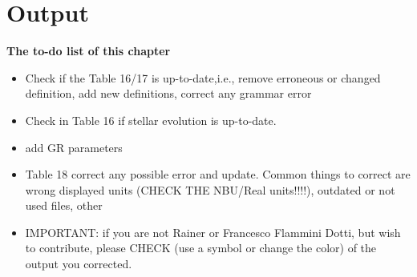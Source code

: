 







\section{Output}
\label{ch:output}

{\bf The to-do list of this chapter

\begin{itemize}
    \item Check if the Table 16/17 is up-to-date,i.e., remove erroneous or changed definition, add new definitions, correct any grammar error
    \item Check in Table 16 if stellar evolution is up-to-date. 
    \item add GR parameters
    \item Table 18 correct any possible error and update. Common things to correct are wrong displayed units (CHECK THE NBU/Real units!!!!), outdated or not used files, other
    \item IMPORTANT: if you are not Rainer or Francesco Flammini Dotti, but wish to contribute, please CHECK (use a symbol or change the color) of the output you corrected.
\end{itemize}
}


